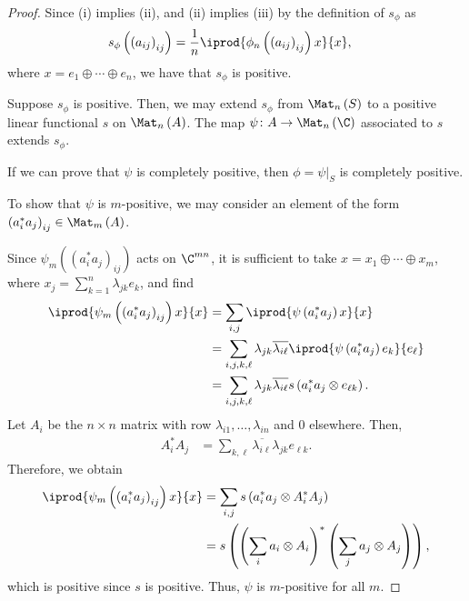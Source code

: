 \documentclass[10pt]{mypackage}
\begin{document}
\begin{proof}
  Since (i) implies (ii), and (ii) implies (iii) by the definition of $s_{\phi}$ as
  \begin{align*}
    s_{\phi}\left( \left( a_{ij} \right)_{ij} \right) &= \frac{1}{n} \iprod{\phi_n\left( \left( a_{ij} \right)_{ij} \right)x}{x},
  \end{align*}
  where $x = e_1\oplus\cdots\oplus e_n$, we have that $s_{\phi}$ is positive.\newline

  Suppose $s_{\phi}$ is positive. Then, we may extend $s_{\phi}$ from $\Mat_n\left( S \right)$ to a positive linear functional $s$ on $\Mat_n\left( A \right)$. The map $\psi\colon A\rightarrow \Mat_n\left( \C \right)$ associated to $s$ extends $s_{\phi}$.\newline

  If we can prove that $\psi$ is completely positive, then $\phi = \psi|_{S}$ is completely positive.\newline

  To show that $\psi$ is $m$-positive, we may consider an element of the form $\left( a^{\ast}_ia_j \right)_{ij} \in \Mat_m\left( A \right)$.\newline

  Since $\psi_m\left( \left( a^{\ast}_ia_j \right)_{ij} \right)$ acts on $\C^{mn}$, it is sufficient to take $x = x_1\oplus\cdots\oplus x_m$, where $x_j = \sum_{k=1}^{n}\lambda_{jk}e_k$, and find
  \begin{align*}
    \iprod{\psi_m\left( \left( a^{\ast}_ia_j \right)_{ij} \right)x}{x} &= \sum_{i,j} \iprod{\psi\left( a_i^{\ast}a_j \right)x}{x}\\
                                                                       &= \sum_{i,j,k,\ell} \lambda_{jk}\overline{\lambda_{i\ell}} \iprod{\psi\left( a_i^{\ast}a_j \right)e_k}{e_{\ell}}\\
                                                                       &= \sum_{i,j,k,\ell}\lambda_{jk}\overline{\lambda_{i\ell}} s\left( a_i^{\ast}a_j\otimes e_{\ell k} \right).
  \end{align*}
  Let $A_i$ be the $n\times n$ matrix with row $\lambda_{i1},\dots,\lambda_{in}$ and $0$ elsewhere. Then,
  \begin{align*}
    A_i^{\ast}A_j &= \sum_{k,\ell}\overline{\lambda_{i\ell}}\lambda_{jk}e_{\ell k}.
  \end{align*}
  Therefore, we obtain
  \begin{align*}
    \iprod{\psi_m\left( \left( a_i^{\ast}a_j \right)_{ij} \right)x}{x} &= \sum_{i,j}s\left( a_i^{\ast}a_j\otimes  A_i^{\ast}A_j\right)\\
                                                                       &= s\left( \left( \sum_{i}a_i\otimes A_i \right)^{\ast}\left( \sum_{j}a_j\otimes A_j \right) \right),
  \end{align*}
  which is positive since $s$ is positive. Thus, $\psi$ is $m$-positive for all $m$.
\end{proof}
\end{document}
